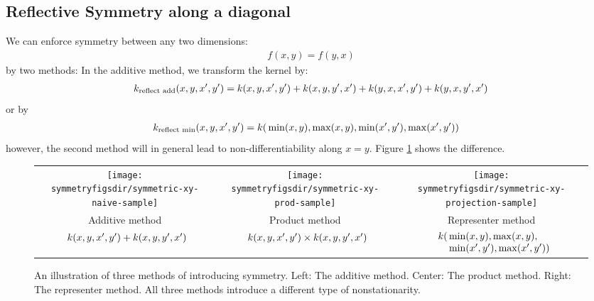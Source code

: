 \subsection{Reflective Symmetry along a diagonal}
We can enforce symmetry between any two dimensions:
%
\begin{align}
f(x, y) = f( y, x)
\end{align}
%
by two methods:  In the additive method, we transform the kernel by:
%
\begin{align}
k_{\textnormal{reflect add}}(x, y, x', y') 
 = k(x, y, x', y') + k(x, y, y', x')
 + k(y, x, x', y') + k(y, x, y', x')
\end{align}
%
or by
%
\begin{align}
k_{\textnormal{reflect min}}(x, y, x', y') = k( & \min(x, y), \max(x,y), %
\min(x', y'), \max(x',y') )
\end{align}
however, the second method will in general lead to non-differentiability along $x = y$.  Figure \ref{fig:add_vs_min} shows the difference.

\begin{figure}
\begin{tabular}{ccc}
\texttt{[image: \\symmetryfigsdir/symmetric-xy-naive-sample]} &
\texttt{[image: \\symmetryfigsdir/symmetric-xy-prod-sample]} &
\texttt{[image: \\symmetryfigsdir/symmetric-xy-projection-sample]} \\
Additive method & Product method & Representer method \\[0.5ex]
$\begin{array}{r@{}l@{}}
k(x, y, x', y') & {}+ k(x, y, y', x') 
\end{array}$
&
$\begin{array}{r@{}l@{}}
k(x, y, x', y') & {}\times k(x, y, y', x') \\
\end{array}$
&
$\begin{array}{r@{}l@{}}
k( &{}\min(x, y), \max(x,y), \\
&{}\min(x', y'), \max(x',y') )
\end{array}$
\end{tabular}
\caption[Three ways to introduce symmetry]{An illustration of three methods of introducing symmetry.
Left:  The additive method.
Center: The product method.
Right: The representer method.
All three methods introduce a different type of nonstationarity.
}
\label{fig:add_vs_min}
\end{figure}


